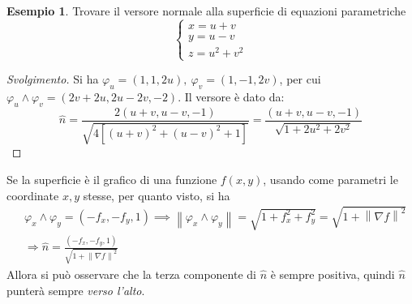 \documentclass[10pt, a4paper]{scrartcl}
\newenvironment{svolgimento}{\renewcommand\qedsymbol{$\blacksquare$}\begin{proof}[Svolgimento]}{\end{proof}}
\theoremstyle{definition}
\newtheorem{esempio}{Esempio}
\numberwithin{esempio}{section}
\theoremstyle{definition}
\numberwithin{obs}{section}
\numberwithin{nota}{section}
\numberwithin{equation}{subsection}
\begin{document}
\begin{esempio}
Trovare il versore normale alla superficie di equazioni parametriche 
\[
\begin{cases}
	x = u + v \\
	y = u -v \\
	z= u^2 + v^2
\end{cases}
\] 
\begin{svolgimento}
Si ha $\varphi _u = (1,1,2u), \ \varphi _v = (1,-1,2v)$, per cui $\varphi _u \wedge \varphi _v = (2v+2u, 2u-2v,-2) $. 
Il versore \`e dato da:
\[
\hat{n} = \frac{2 (u+v , u-v ,-1)}{\sqrt{4 \left[ (u+v)^2 + (u-v)^2 + 1  \right] } } = \frac{(u+v,u-v,-1)}{\sqrt{1+2u^2 + 2v^2} }
\] 

\end{svolgimento}
\end{esempio}
Se la superficie \`e il grafico di una funzione $f(x,y)$, usando come parametri le coordinate $x,y$ stesse, per quanto visto, si ha
\[
	\begin{split}
		&\varphi _x \wedge   \varphi _y = (-f_x , -f_y ,1) \implies \left\lVert \varphi _x \wedge \varphi _y \right\rVert = \sqrt{1+ f_x^2 + f_y^2} = \sqrt{1+ \left\lVert \nabla f \right\rVert ^2} \\
		&\Rightarrow \hat{n}=\frac{(-f_x,-f_y,1)}{\sqrt{1+\left\lVert \nabla f \right\rVert ^2} }
	\end{split}
\] 
Allora si pu\`o osservare che la terza componente di $\hat{n}$ \`e sempre positiva, quindi $\hat{n}$ punter\`a sempre \textit{verso l'alto}.
\end{document}
